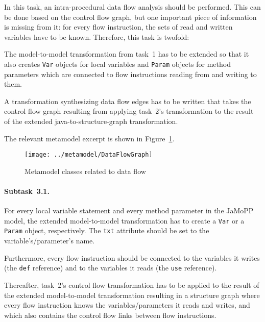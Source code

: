 \documentclass[submission]{eptcs}
\begin{document}
In this task, an intra-procedural data flow analysis should be performed.  This
can be done based on the control flow graph, but one important piece of
information is missing from it: for every flow instruction, the sets of read
and written variables have to be known.  Therefore, this task is twofold:

\begin{compactenum}
\item The model-to-model transformation from task~1 has to be extended so that
  it also creates \verb|Var| objects for local variables and \verb|Param|
  objects for method parameters which are connected to flow instructions
  reading from and writing to them.
\item A transformation synthesizing data flow edges has to be written that
  takes the control flow graph resulting from applying task~2's transformation
  to the result of the extended java-to-structure-graph transformation.
\end{compactenum}

The relevant metamodel excerpt is shown in Figure~\ref{fig:data-flow-mm}.

\begin{figure}[h!]
  \centering
  \texttt{[image: ../metamodel/DataFlowGraph]}
  \caption{Metamodel classes related to data flow}
  \label{fig:data-flow-mm}
\end{figure}

\paragraph{Subtask~3.1.}
\label{sec:subtask-3.1}

For every local variable statement and every method parameter in the JaMoPP
model, the extended model-to-model transformation has to create a \verb|Var| or
a \verb|Param| object, respectively.  The \verb|txt| attribute should be set to
the variable's/parameter's name.

Furthermore, every flow instruction should be connected to the variables it
writes (the \verb|def| reference) and to the variables it reads (the \verb|use|
reference).

Thereafter, task~2's control flow transformation has to be applied to the
result of the extended model-to-model transformation resulting in a structure
graph where every flow instruction knows the variables/parameters it reads and
writes, and which also contains the control flow links between flow
instructions.
\end{document}

